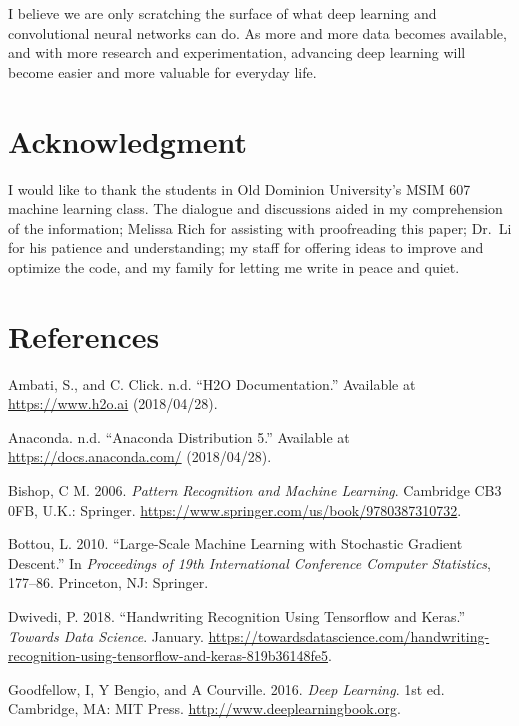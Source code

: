 \documentclass[conference,final,]{IEEEtran}
\begin{document}
I believe we are only scratching the surface of what deep learning and
convolutional neural networks can do. As more and more data becomes
available, and with more research and experimentation, advancing deep
learning will become easier and more valuable for everyday life.

\section{Acknowledgment}\label{acknowledgment}

I would like to thank the students in Old Dominion University's MSIM 607
machine learning class. The dialogue and discussions aided in my
comprehension of the information; Melissa Rich for assisting with
proofreading this paper; Dr.~Li for his patience and understanding; my
staff for offering ideas to improve and optimize the code, and my family
for letting me write in peace and quiet.

\newpage

\section*{References}\label{references}

\hypertarget{refs}{}
\hypertarget{ref-h2o}{}
Ambati, S., and C. Click. n.d. ``H2O Documentation.'' Available at
\url{https://www.h2o.ai} (2018/04/28).

\hypertarget{ref-py3}{}
Anaconda. n.d. ``Anaconda Distribution 5.'' Available at
\url{https://docs.anaconda.com/} (2018/04/28).

\hypertarget{ref-bishop2006}{}
Bishop, C M. 2006. \emph{Pattern Recognition and Machine Learning}.
Cambridge CB3 0FB, U.K.: Springer.
\url{https://www.springer.com/us/book/9780387310732}.

\hypertarget{ref-sgd2010}{}
Bottou, L. 2010. ``Large-Scale Machine Learning with Stochastic Gradient
Descent.'' In \emph{Proceedings of 19th International Conference
Computer Statistics}, 177--86. Princeton, NJ: Springer.

\hypertarget{ref-dwivedi2018}{}
Dwivedi, P. 2018. ``Handwriting Recognition Using Tensorflow and
Keras.'' \emph{Towards Data Science}. January.
\url{https://towardsdatascience.com/handwriting-recognition-using-tensorflow-and-keras-819b36148fe5}.

\hypertarget{ref-goodfellow2016}{}
Goodfellow, I, Y Bengio, and A Courville. 2016. \emph{Deep Learning}.
1st ed. Cambridge, MA: MIT Press. \url{http://www.deeplearningbook.org}.
\end{document}
